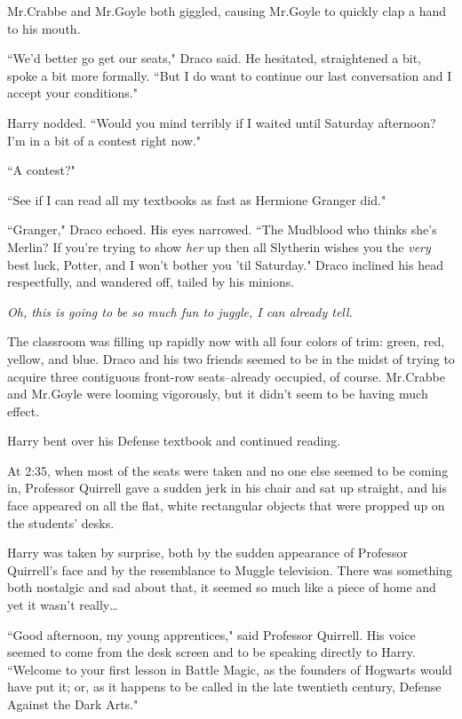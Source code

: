 Mr.\?Crabbe and Mr.\?Goyle both giggled, causing Mr.\?Goyle to quickly clap a hand to his mouth.

``We'd better go get our seats," Draco said. He hesitated, straightened a bit, spoke a bit more formally. ``But I do want to continue our last conversation and I accept your conditions."

Harry nodded. ``Would you mind terribly if I waited until Saturday afternoon? I'm in a bit of a contest right now."

``A contest?"

``See if I can read all my textbooks as fast as Hermione Granger did."

``Granger," Draco echoed. His eyes narrowed. ``The Mudblood who thinks she's Merlin? If you're trying to show \emph{her} up then all Slytherin wishes you the \emph{very} best luck, Potter, and I won't bother you 'til Saturday." Draco inclined his head respectfully, and wandered off, tailed by his minions.

\emph{Oh, this is going to be \emph{so} much fun to juggle, I can already tell.}

The classroom was filling up rapidly now with all four colors of trim: green, red, yellow, and blue. Draco and his two friends seemed to be in the midst of trying to acquire three contiguous front-row seats\---already occupied, of course. Mr.\?Crabbe and Mr.\?Goyle were looming vigorously, but it didn't seem to be having much effect.

Harry bent over his Defense textbook and continued reading.

\later

At 2:35\pm, when most of the seats were taken and no one else seemed to be coming in, Professor Quirrell gave a sudden jerk in his chair and sat up straight, and his face appeared on all the flat, white rectangular objects that were propped up on the students' desks.

Harry was taken by surprise, both by the sudden appearance of Professor Quirrell's face and by the resemblance to Muggle television. There was something both nostalgic and sad about that, it seemed so much like a piece of home and yet it wasn't really{\ldots}

``Good afternoon, my young apprentices," said Professor Quirrell. His voice seemed to come from the desk screen and to be speaking directly to Harry. ``Welcome to your first lesson in Battle Magic, as the founders of Hogwarts would have put it; or, as it happens to be called in the late twentieth century, Defense Against the Dark Arts."


